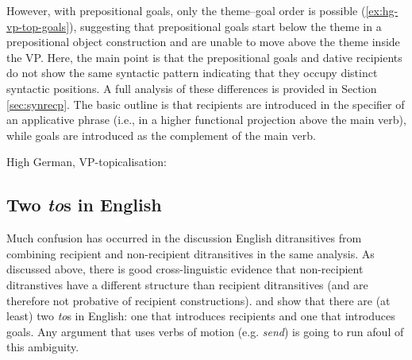 	However, with prepositional goals, only the theme--goal order is possible (\ref{ex:hg-vp-top-goals}), suggesting that prepositional goals start below the theme in a prepositional object construction and are unable to move above the theme inside the VP. Here, the main point is that the prepositional goals and dative recipients do not show the same syntactic pattern indicating that they occupy distinct syntactic positions. A full analysis of these differences is provided in Section \ref{sec:synrecp}. The basic outline is that recipients are introduced in the specifier of an applicative phrase (i.e., in a higher functional projection above the main verb), while goals are introduced as the complement of the main verb. 

	\begin{exe}
		\ex\label{ex:hg-vp-top-goals} High German, VP-topicalisation:
		\begin{xlist}
		\end{xlist}
	\end{exe}

	\subsection{Two \textit{to}s in English}
	Much confusion has occurred in the discussion English ditransitives from combining recipient and non-recipient ditransitives in the same analysis. As discussed above, there is good cross-linguistic evidence that non-recipient ditranstives have a different structure than recipient ditransitives (and are therefore not probative of recipient constructions). \cite{Levinson.2005} and \cite{Hovav.2008} show that there are (at least) two \textit{to}s in English: one that introduces recipients and one that introduces goals. Any argument that uses verbs of motion (e.g. \textit{send}) is going to run afoul of this ambiguity.

